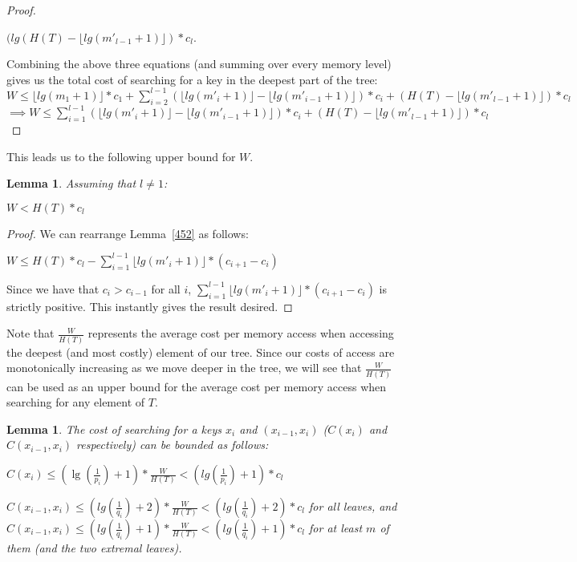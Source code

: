 \documentclass[letterpaper,12pt,titlepage,oneside,final]{book}
\theoremstyle{plain}
\newtheorem{lem}[thm]{Lemma}
\begin{document}
\begin{proof}
\begin{center}
$(lg(H(T) - \lfloor lg(m'_{l-1}+1) \rfloor)*c_l$.
\end{center}

Combining the above three equations (and summing over every memory level) gives us the total cost of searching for a key in the deepest part of the tree:\\


$W \leq \lfloor lg(m_1 + 1) \rfloor * c_1 + \sum_{i=2}^{l-1} (\lfloor lg(m'_i+1) \rfloor - \lfloor lg(m'_{i-1}+1) \rfloor)*c_i+ (H(T) - \lfloor lg(m'_{l-1}+1) \rfloor)*c_l$
$\implies W \leq \sum_{i=1}^{l-1} (\lfloor lg(m'_i+1) \rfloor - \lfloor lg(m'_{i-1}+1) \rfloor)*c_i+ (H(T) - \lfloor lg(m'_{l-1}+1) \rfloor)*c_l$


\end{proof}

This leads us to the following upper bound for $W$.

\begin{lem} \label{W<HT}
Assuming that $l \neq 1$:
\begin{center}
$W<H(T)*c_l$
\end{center}
\end{lem}

\begin{proof}
We can rearrange Lemma~\ref{452} as follows:
\begin{center}
$W \leq H(T)*c_l - \sum_{i=1}^{l-1} \lfloor lg(m'_i+1) \rfloor *(c_{i+1} - c_i) $
\end{center}
Since we have that $c_i > c_{i-1}$ for all $i$, $\sum_{i=1}^{l-1} \lfloor lg(m'_i+1) \rfloor *(c_{i+1} - c_i)$ is strictly positive. This instantly gives the result desired.
\end{proof}

Note that $\frac{W}{H(T)}$ represents the average cost per memory access when accessing the deepest (and most costly) element of our tree. Since our costs of access are monotonically increasing as we move deeper in the tree, we will see that $\frac{W}{H(T)}$ can be used as an upper bound for the average cost per memory access when searching for any element of $T$.

\begin{lem}
The cost of searching for a keys $x_i$ and $(x_{i-1},x_i)$ ($C(x_i)$ and $C(x_{i-1},x_i)$ respectively) can be bounded as follows: 

\begin{center} $C(x_i) \leq (\lg(\frac{1}{p_i})+1)*\frac{W}{H(T)} < (lg(\frac{1}{p_i})+1)*c_l$ 
\end{center}


\begin{center}
$C(x_{i-1},x_i) \leq (lg(\frac{1}{q_i})+2)*\frac{W}{H(T)} < (lg(\frac{1}{q_i})+2)*c_l$ for all leaves, and \\
$C(x_{i-1},x_i) \leq (lg(\frac{1}{q_i})+1)*\frac{W}{H(T)} < (lg(\frac{1}{q_i})+1)*c_l$ for at least $m$ of them (and the two extremal leaves).

 \end{center}
\end{lem}
\end{document}
